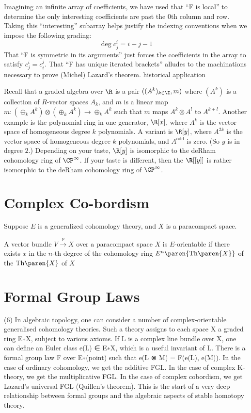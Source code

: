 \documentclass{ccg-topic}
\newcommand{\Th}[1]{\mathrm{Th}\paren{#1}}
\begin{document}
Imagining an infinite array of coefficients, we have used that ``F is local'' to determine the only interesting coefficients are past the $0$th column and row. Taking this ``interesting'' subarray helps justify the indexing conventions when we impose the following grading:
\[
    \deg c^i_j = i + j -1
\]
That ``F is symmetric in its arguments'' just forces the coefficients in the array to satisfy $c^i_j = c^j_i$. That ``F has unique iterated brackets'' alludes to the machinations necessary to prove (Michel) Lazard's theorem. historical application

\begin{ex}
    \label{ex:derham_cohomology_algebra}
Recall that a graded algebra over $\R$ is a pair $((A^k)_{k \in \Z}, m)$ where
$(A^k)$ is a collection of $R$-vector spaces $A_k$, and $m$ is a linear map
$m \colon (\oplus_k A^k) \otimes (\oplus_k A^k) \to \oplus_k A^k$ such that $m$ maps $A^k \otimes A^l$ to $A^{k+l}$.
    Another example is the polynomial ring in one generator, $\R[x]$, where $A^k$ is the vector space of homogeneous degree $k$ polynomials. A variant is $\R[y]$, where $A^{2k}$ is the vector space of homogeneous degree $k$ polynomials, and $A^\text{odd}$ is zero. (So $y$ is in degree $2$.) Depending on your taste, $\R[y]$ is isomorphic to the deRham cohomology ring of $\CP^\infty$. If your taste is different, then the  $\R[[y]]$ is rather isomorphic to the deRham cohomology ring of $\CP^\infty$.
\end{ex}

\section{Complex Co-bordism}

Suppose $E$ is a generalized cohomology theory, and $X$ is a paracompact space.

\begin{defn}[$E$-orientation]
    \label{defn:_e_orientation}
    A vector bundle $V \xrightarrow{p} X$ over a paracompact space $X$ is $E$-orientable if there exists $x$ in the $n$-th degree of the cohomology ring $E^n \paren{\Th X}$ of the  $\Th X$ of $X$ \TODO
\end{defn}

\section{Formal Group Laws}

(6) In algebraic topology, one can consider a number of complex-orientable generalised cohomology
theories. Such a theory assigns to each space X a graded ring E∗X, subject to various axioms. If
L is a complex line bundle over X, one can define an Euler class e(L) ∈ E∗X, which is a useful
invariant of L. There is a formal group law F over E∗(point) such that e(L ⊗ M) = F(e(L), e(M)).
In the case of ordinary cohomology, we get the additive FGL. In the case of complex K-theory,
we get the multiplicative FGL. In the case of complex cobordism, we get Lazard’s universal FGL
(Quillen’s theorem). This is the start of a very deep relationship between formal groups and the
algebraic aspects of stable homotopy theory.



\end{document}
